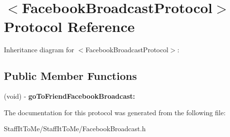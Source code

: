 \hypertarget{protocol_facebook_broadcast_protocol-p}{
\section{$<$\-Facebook\-Broadcast\-Protocol$>$ \-Protocol \-Reference}
\label{protocol_facebook_broadcast_protocol-p}
}


\-Inheritance diagram for $<$\-Facebook\-Broadcast\-Protocol$>$\-:
\subsection*{\-Public \-Member \-Functions}
\begin{DoxyCompactItemize}
\item 
\hypertarget{protocol_facebook_broadcast_protocol-p_ab6685409d81b91075eb60332508faeef}{
(void) -\/ {\bfseries go\-To\-Friend\-Facebook\-Broadcast\-:}}
\label{protocol_facebook_broadcast_protocol-p_ab6685409d81b91075eb60332508faeef}

\end{DoxyCompactItemize}


\-The documentation for this protocol was generated from the following file\-:\begin{DoxyCompactItemize}
\item 
\-Staff\-It\-To\-Me/\-Staff\-It\-To\-Me/\-Facebook\-Broadcast.\-h\end{DoxyCompactItemize}
